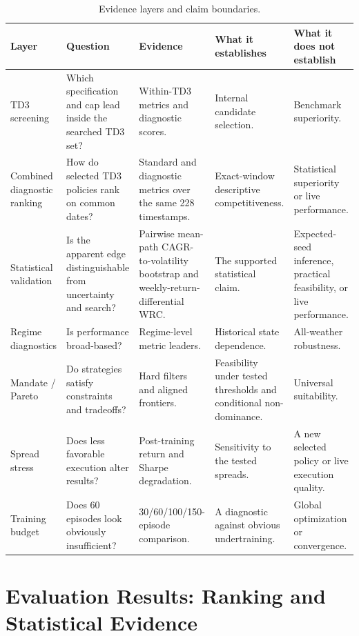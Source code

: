 \documentclass[11pt]{article}
\renewcommand{\arraystretch}{1.18}
\begin{document}
\begin{table}[H]
\centering
\caption{Evidence layers and claim boundaries.}
\label{tab:reporting-layers}
\scriptsize
\setlength{\tabcolsep}{3.2pt}
\renewcommand{\arraystretch}{1.12}
\begin{tabularx}{\textwidth}{L{0.15\textwidth} L{0.19\textwidth} L{0.18\textwidth} Y Y}
\toprule
Layer & Question & Evidence & What it establishes & What it does not establish \\
\midrule
TD3 screening & Which specification and cap lead inside the searched TD3 set? & Within-TD3 metrics and diagnostic scores. & Internal candidate selection. & Benchmark superiority. \\
Combined diagnostic ranking & How do selected TD3 policies rank on common dates? & Standard and diagnostic metrics over the same 228 timestamps. & Exact-window descriptive competitiveness. & Statistical superiority or live performance. \\
Statistical validation & Is the apparent edge distinguishable from uncertainty and search? & Pairwise mean-path CAGR-to-volatility bootstrap and weekly-return-differential WRC. & The supported statistical claim. & Expected-seed inference, practical feasibility, or live performance. \\
Regime diagnostics & Is performance broad-based? & Regime-level metric leaders. & Historical state dependence. & All-weather robustness. \\
Mandate / Pareto & Do strategies satisfy constraints and tradeoffs? & Hard filters and aligned frontiers. & Feasibility under tested thresholds and conditional non-dominance. & Universal suitability. \\
Spread stress & Does less favorable execution alter results? & Post-training return and Sharpe degradation. & Sensitivity to the tested spreads. & A new selected policy or live execution quality. \\
Training budget & Does 60 episodes look obviously insufficient? & 30/60/100/150-episode comparison. & A diagnostic against obvious undertraining. & Global optimization or convergence. \\
\bottomrule
\end{tabularx}
\end{table}

\section{Evaluation Results: Ranking and Statistical Evidence}
\end{document}
